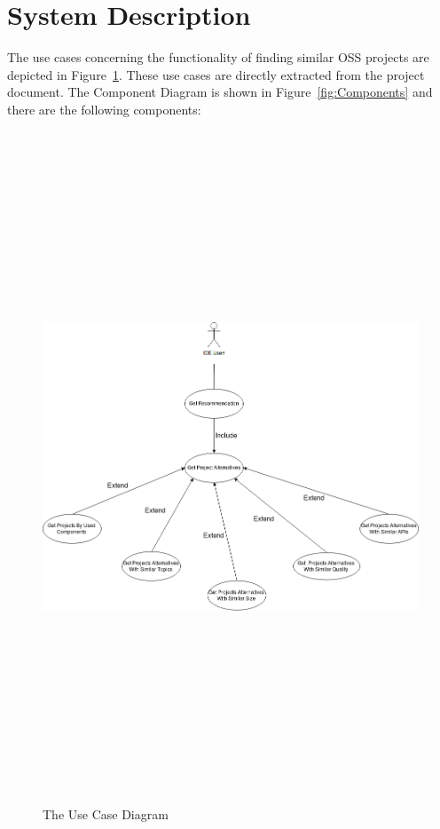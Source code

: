 
\section{System Description}


The use cases concerning the functionality of finding similar OSS projects are depicted in Figure~\ref{fig:UseCases}. These use cases are directly extracted from the \projectName pr\-oject document. The Component Diagram is shown in Figure~\ref{fig:Components} and there are the following components:

\begin{figure}[!h]
	\includegraphics[width=15cm,height=20cm,keepaspectratio]{images/UseCaseDiagram.png}
	\caption{The Use Case Diagram}
	\label{fig:UseCases}
\end{figure}

